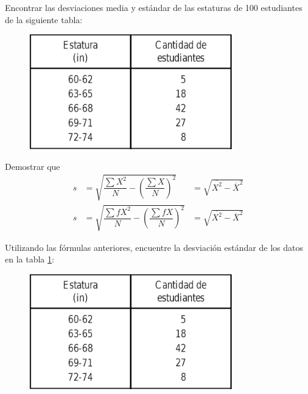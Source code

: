  

 
 \begin{problema}
  \label{problema:4.11}
  Encontrar las desviaciones media y estándar de las estaturas de 100 estudiantes de la siguiente tabla:
  \begin{figure}[ht]
  \centering
  \includegraphics[height=5cm,keepaspectratio=true]{./images/tab0201.png}
  \label{tab:0201}
 \end{figure}

 \end{problema}

 

 
 \begin{problema}
  \label{problema:4.12}
  Demostrar que
  \begin{align}
 s &= \sqrt{\dfrac{\sum X^{2}}{N}-\left( \dfrac{\sum X}{N} \right)^{2}}&=
 \sqrt{\overline{X^{2}}-\overline{X}^{2}}\\
 s &= \sqrt{\dfrac{\sum fX^{2}}{N}-\left( \dfrac{\sum fX}{N} \right)^{2}}&=
 \sqrt{\overline{X^{2}}-\overline{X}^{2}}
 \end{align}
 \end{problema}

 

 
 \begin{problema}
  \label{problema:4.14}
  Utilizando las fórmulas anteriores, encuentre la desviación estándar de los datos en la tabla \ref{tab:0201}:
   \begin{figure}[ht]
  \centering
  \includegraphics[height=5cm,keepaspectratio=true]{./images/tab0201.png}
 \end{figure}

 \end{problema}

